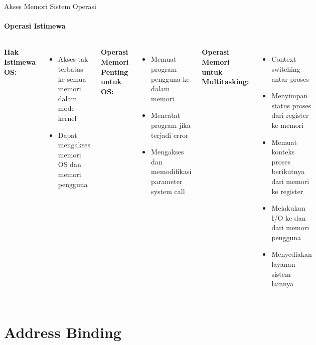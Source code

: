 \documentclass[10pt,aspectratio=169]{beamer}
\begin{document}
\begin{frame}{Akses Memori Sistem Operasi}
    \framesubtitle{Operasi Istimewa}
    
    \begin{columns}[T]
            \textbf{Hak Istimewa OS:}
            \begin{itemize}
                \item Akses tak terbatas ke semua memori dalam mode kernel
                \item Dapat mengakses memori OS dan memori pengguna
            \end{itemize}
            
            \textbf{Operasi Memori Penting untuk OS:}
            \begin{itemize}
                \item Memuat program pengguna ke dalam memori
                \item Mencatat program jika terjadi error
                \item Mengakses dan memodifikasi parameter system call
            \end{itemize}
            
            \textbf{Operasi Memori untuk Multitasking:}
            \begin{itemize}
                \item Context switching antar proses
                \item Menyimpan status proses dari register ke memori
                \item Memuat konteks proses berikutnya dari memori ke register
                \item Melakukan I/O ke dan dari memori pengguna
                \item Menyediakan layanan sistem lainnya
            \end{itemize}
    \end{columns}
\end{frame}

\section{Address Binding}
\end{document}
